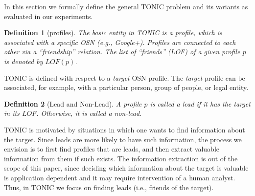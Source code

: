 \documentclass[journal]{IEEEtran}
\newtheorem{definition}{Definition}
\begin{document}





In this section we formally define the general TONIC problem and its variants as evaluated in our experiments. %


\begin{definition}[profiles]
The basic entity in TONIC is a {\em profile}, which is associated with a specific OSN (e.g., Google+). Profiles are connected to each other via a ``friendship'' relation.  The {\em list of ``friends''} (LOF) of a given profile $p$ is denoted by $LOF(p)$. 
\label{def:profile}
\end{definition}


TONIC is defined with respect to a {\em target} OSN profile. 
The {\em target} profile can be associated, for example, with a particular person, group of people, or legal entity. 


\begin{definition}[Lead and Non-Lead]
A profile $p$ is called a {\em lead} if it has the target in its \(LOF\). Otherwise, it is called a {\em non-lead}.   
\label{def:lead}
\end{definition}


TONIC is motivated by situations in which one wants to find information about the target. 
Since leads are more likely to have such information, the process we envision is to first find profiles that are leads, and then extract valuable information from them if such exists. The information extraction is out of the scope of this paper, since deciding which information about the target is valuable is application dependent and it may require intervention of a human analyst. Thus, in TONIC we focus on finding leads (i.e., friends of the target).
\end{document}
